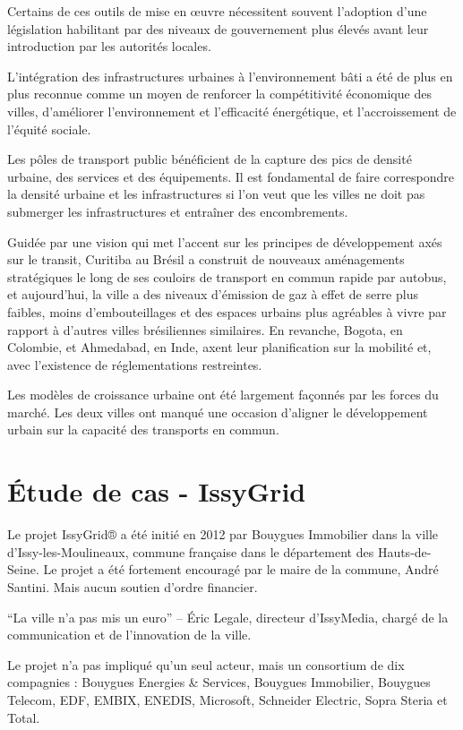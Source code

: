 Certains de ces outils de mise en œuvre nécessitent souvent l'adoption d'une législation habilitant par
des niveaux de gouvernement plus élevés avant leur introduction par les autorités locales.

L'intégration des infrastructures urbaines à l'environnement bâti a été de plus en plus
reconnue comme un moyen de renforcer la compétitivité économique des villes, d'améliorer
l'environnement et l'efficacité énergétique, et l'accroissement de l'équité sociale.

Les pôles de transport public bénéficient de la capture des pics de densité urbaine,
des services et des équipements. Il est fondamental de faire correspondre la densité urbaine et
les infrastructures si l'on veut que les villes ne doit pas submerger les infrastructures
et entraîner des encombrements.

Guidée par une vision qui met l'accent sur les principes de développement axés sur le transit,
Curitiba au Brésil a construit de nouveaux aménagements stratégiques le long de ses couloirs de transport
en commun rapide par autobus, et aujourd'hui, la ville a des niveaux d'émission de gaz à effet de serre plus
faibles, moins d'embouteillages et des espaces urbains plus agréables à vivre par rapport à d'autres
villes brésiliennes similaires. En revanche, Bogota, en Colombie, et Ahmedabad, en Inde, axent leur
planification sur la mobilité et, avec l'existence de réglementations restreintes.

Les modèles de croissance urbaine ont été largement façonnés par les forces du marché. Les deux villes
ont manqué une occasion d'aligner le développement urbain sur la capacité des transports en commun.

\section{Étude de cas - IssyGrid}
Le projet IssyGrid® a été initié en 2012 par Bouygues Immobilier dans la ville d'Issy-les-Moulineaux,
commune française dans le département des Hauts-de-Seine. Le projet a été fortement encouragé par le
maire de la commune, André Santini. Mais aucun soutien d'ordre financier.

``La ville n’a pas mis un euro'' --  Éric Legale, directeur d’IssyMedia, chargé de la communication et
de l’innovation de la ville.

Le projet n'a pas impliqué qu'un seul acteur, mais un consortium de dix compagnies :
Bouygues Energies \& Services, Bouygues Immobilier, Bouygues Telecom, EDF, EMBIX, ENEDIS,
Microsoft, Schneider Electric, Sopra Steria et Total.

